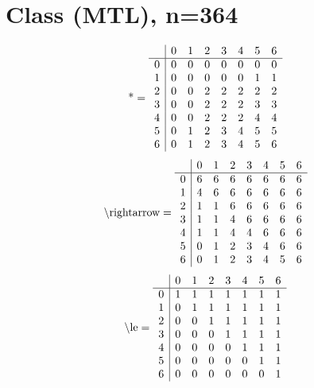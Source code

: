\documentclass[11pt]{article}
\begin{document}
\section{Class (MTL), n=364}
\[\text{*} = 
\begin{array}{r | r r r r r r r}
 & 0 & 1 & 2 & 3 & 4 & 5 & 6 \\ \hline
0 & 0 & 0 & 0 & 0 & 0 & 0 & 0 \\
1 & 0 & 0 & 0 & 0 & 0 & 1 & 1 \\
2 & 0 & 0 & 2 & 2 & 2 & 2 & 2 \\
3 & 0 & 0 & 2 & 2 & 2 & 3 & 3 \\
4 & 0 & 0 & 2 & 2 & 2 & 4 & 4 \\
5 & 0 & 1 & 2 & 3 & 4 & 5 & 5 \\
6 & 0 & 1 & 2 & 3 & 4 & 5 & 6 \\
\end{array}
\]
\[\text{\textbackslash rightarrow} = 
\begin{array}{r | r r r r r r r}
 & 0 & 1 & 2 & 3 & 4 & 5 & 6 \\ \hline
0 & 6 & 6 & 6 & 6 & 6 & 6 & 6 \\
1 & 4 & 6 & 6 & 6 & 6 & 6 & 6 \\
2 & 1 & 1 & 6 & 6 & 6 & 6 & 6 \\
3 & 1 & 1 & 4 & 6 & 6 & 6 & 6 \\
4 & 1 & 1 & 4 & 4 & 6 & 6 & 6 \\
5 & 0 & 1 & 2 & 3 & 4 & 6 & 6 \\
6 & 0 & 1 & 2 & 3 & 4 & 5 & 6 \\
\end{array}
\]
\[\text{\textbackslash le} = 
\begin{array}{r | r r r r r r r}
 & 0 & 1 & 2 & 3 & 4 & 5 & 6 \\ \hline
0 & 1 & 1 & 1 & 1 & 1 & 1 & 1 \\
1 & 0 & 1 & 1 & 1 & 1 & 1 & 1 \\
2 & 0 & 0 & 1 & 1 & 1 & 1 & 1 \\
3 & 0 & 0 & 0 & 1 & 1 & 1 & 1 \\
4 & 0 & 0 & 0 & 0 & 1 & 1 & 1 \\
5 & 0 & 0 & 0 & 0 & 0 & 1 & 1 \\
6 & 0 & 0 & 0 & 0 & 0 & 0 & 1 \\
\end{array}
\]
\end{document}
